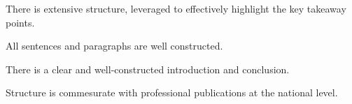 \documentclass{../../fal_assignment}
\begin{document}
\begin{markingrubric}
        \grade 		There is extensive structure, leveraged to effectively highlight the key takeaway points.
        \par 		All sentences and paragraphs are well constructed.
        \par 		There is a clear and well-constructed introduction and conclusion.
        \par 		Structure is commesurate with professional publications at the national level.   

\end{markingrubric}
\end{document}

